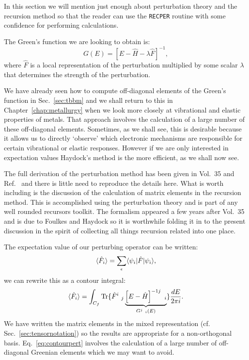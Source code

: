 In this section we will mention just enough about perturbation theory and the recursion method so that
the reader can use the \texttt{RECPER} routine with some confidence for performing calculations. 

The Green's function we are looking to obtain is:
%
\begin{equation}
G(E) = \left[E - \hat{H} - \lambda \hat{F}\right]^{-1},
\end{equation}
%
where $\hat{F}$ is a local representation of the perturbation multiplied by some scalar $\lambda$
that determines the strength of the perturbation. 

We have already seen how to compute off-diagonal elements of the Green's function in Sec.~\ref{sec:tbbm} and
we shall return to this in Chapter~\ref{chap:metallurgy} when we look more closely at vibrational
and elastic properties of metals. That approach involves the calculation of a large number of these off-diagonal
elements. Sometimes, as we shall see, this is desirable because it allows us to directly `observe' which electronic
mechanisms are responsible for certain vibrational or elastic responses. However if we are only interested in expectation
values Haydock's method is the more efficient, as we shall now see.

The full derivation of the perturbation method has been given
in Vol.~35 and Ref.~\cite{haydock77} and there is little need to reproduce
the details here. What is worth including is the discussion of the calculation of matrix elements in the 
recursion method. This is accomplished using the perturbation theory and is part of any well rounded recursors toolkit.
The formalism appeared a few years after Vol.~35 and is due to Foulkes and Haydock \cite{foulkes86} so it 
is worthwhile folding it in to the present discussion in the spirit of collecting all things recursion related into one place.

The expectation value of our perturbing operator can be written:
%
\begin{equation}
\langle \hat{F}_{i} \rangle = \sum_{\epsilon}\langle\psi_{i}|\hat{F}|\psi_{i}\rangle,
\end{equation}
%
we can rewrite this as a contour integral:
%
\begin{equation}
\label{eq:contourpert}
        \bra \hat{F}_{i} \ket = \int_{C_{f}} {\rm Tr} \{ \hat{F}^{i}\ _{j} \underbrace{\left[E-\hat{H}\right]^{-1j}\ _{i}}_{G^{j}\ _{i}(E)} \} \frac{dE}{2\pi i}.
\end{equation}
%
We have written the matrix elements in the mixed representation (cf. Sec.~\ref{sec:tensornotation}) so
the results are appropriate for a non-orthogonal basis. Eq.~\ref{eq:contourpert} involves the calculation
of a large number of off-diagonal Greenian elements which we may want to avoid.

